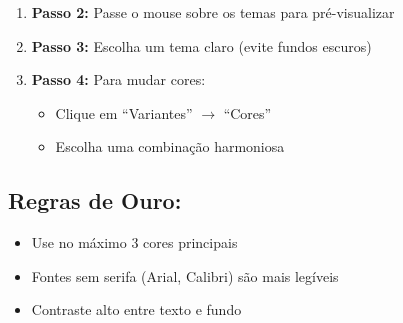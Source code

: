 \documentclass[11pt]{article}
\begin{document}
\begin{multicols}{2}
\begin{enumerate}
\item \textbf{Passo 2:} Passe o mouse sobre os temas para pré-visualizar

\item \textbf{Passo 3:} Escolha um tema claro (evite fundos escuros)

\item \textbf{Passo 4:} Para mudar cores:
\begin{itemize}
\item Clique em ``Variantes'' $\rightarrow$ ``Cores''
\item Escolha uma combinação harmoniosa
\end{itemize}
\end{enumerate}

\subsection*{Regras de Ouro:}
\begin{itemize}
\item Use no máximo 3 cores principais
\item Fontes sem serifa (Arial, Calibri) são mais legíveis
\item Contraste alto entre texto e fundo
\end{itemize}

\end{multicols}
\end{document}
